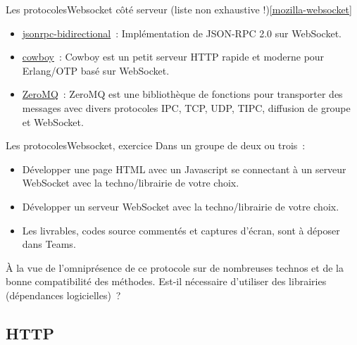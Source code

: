 \documentclass{beamer}
\begin{document}
\begin{frame}{Les protocoles}{Websocket côté serveur (liste non exhaustive !)\cref{mozilla-websocket}}
\begin{scriptsize}
\begin{itemize}
                \item \href{https://github.com/bigstepinc/jsonrpc-bidirectional}{jsonrpc-bidirectional}~: Implémentation de JSON-RPC 2.0 sur WebSocket.

                \item \href{https://github.com/ninenines/cowboy}{cowboy}~: Cowboy est un petit serveur HTTP rapide et moderne pour Erlang/OTP basé sur WebSocket.

                \item \href{https://zeromq.org}{ZeroMQ}~: ZeroMQ est une bibliothèque de fonctions pour transporter des messages avec divers protocoles IPC, TCP, UDP, TIPC, diffusion de groupe et WebSocket.

            \end{itemize}
        \end{scriptsize}
    \end{frame}

    \begin{frame}{Les protocoles}{Websocket, exercice \execcounterdispinc}
        Dans un groupe de deux ou trois~:
        \begin{itemize}
            \item Développer une page HTML avec un Javascript se connectant à un serveur WebSocket avec la techno/librairie de votre choix.
            \item Développer un serveur WebSocket avec la techno/librairie de votre choix.
            \item Les livrables, codes source commentés et captures d'écran, sont à déposer dans Teams.
        \end{itemize}
        \begin{dangercolorbox}
            À la vue de l'omniprésence de ce protocole sur de nombreuses technos et de la bonne compatibilité des méthodes.
            Est-il nécessaire d'utiliser des librairies (dépendances logicielles)~?
        \end{dangercolorbox}
    \end{frame}

    \subsection{HTTP}\label{subsec:http}
\end{document}
